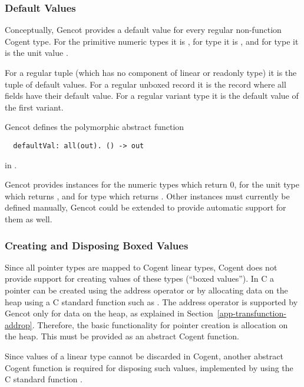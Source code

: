 \subsubsection{Default Values}

Conceptually, Gencot provides a default value for every regular non-function Cogent type. For the primitive numeric types it is 
, for type  it is , and for type \code{()} it is the unit value \code{()}.

For a regular tuple (which has no component of linear or readonly type) it is the tuple of default values. For a
regular unboxed record it is the record where all fields have their default value. For a regular variant type it is
the default value of the first variant.

Gencot defines the polymorphic abstract function
\begin{verbatim}
  defaultVal: all(out). () -> out
\end{verbatim}
in . 

Gencot provides instances for the numeric types  which return 0, for the unit type \code{()} which returns 
\code{()}, and for type  which returns . 
Other instances must currently be defined manually, Gencot could be extended to provide automatic support for them as well.

\subsubsection{Creating and Disposing Boxed Values}

Since all pointer types are mapped to Cogent linear types, Cogent does not provide support for creating values
of these types (``boxed values''). In C a pointer can be created using the address operator \code{\&} or by allocating data on
the heap using a C standard function such as . The address operator is supported by Gencot
only for data on the heap, as explained in Section~\ref{app-transfunction-addrop}. Therefore, the basic functionality
for pointer creation is allocation on the heap. This must be provided as an abstract Cogent function.

Since values of a linear type cannot be discarded in Cogent, another abstract Cogent function is required for
disposing such values, implemented by using the C standard function .

